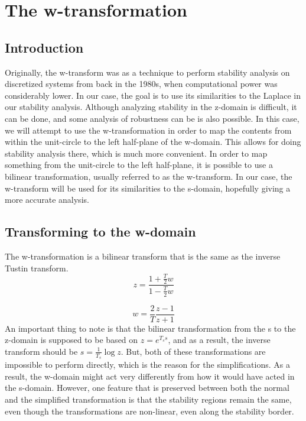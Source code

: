\chapter{The w-transformation} 
\label{chp:w_transformation}
\section{Introduction}
Originally, the w-transform was as a technique to perform stability analysis on discretized systems from back in the 1980s, when computational power was considerably lower. In our case, the goal is to use its similarities to the Laplace in our stability analysis. 
Although analyzing stability in the z-domain is difficult, it can be done, and some analysis of robustness can be is also possible. In this case, we will attempt to use the w-transformation in order to map the contents from within the unit-circle to the left half-plane of the w-domain. This allows for doing stability analysis there, which is much more convenient. In order to map something from the unit-circle to the left half-plane, it is possible to use a bilinear transformation, usually referred to as the w-transform. In our case, the w-transform will be used for its similarities to the s-domain, 
 hopefully giving a more accurate analysis. 

 \section{Transforming to the w-domain}
 The w-transformation is a bilinear transform that is the same as the inverse Tustin transform. 
\begin{equation}
 z = \frac{1 + \frac{T}{2}w}{1 - \frac{T}{2}w}
\end{equation}{}

\begin{equation}
 w = \frac{2}{T}\frac{z-1}{z+1}
\end{equation}{}
An important thing to note is that the bilinear transformation from the s to the z-domain is supposed to be based on $z = e^{T_s s}$, and as a result, the inverse transform should be $s = \frac{1}{T_s}\log{z}$. But, both of these transformations are impossible to perform directly, which is the reason for the simplifications. As a result, the w-domain might act very differently from how it would have acted in the s-domain. However, one feature that is preserved between both the normal and the simplified transformation is that the stability regions remain the same, even though the transformations are non-linear, even along the stability border. 

